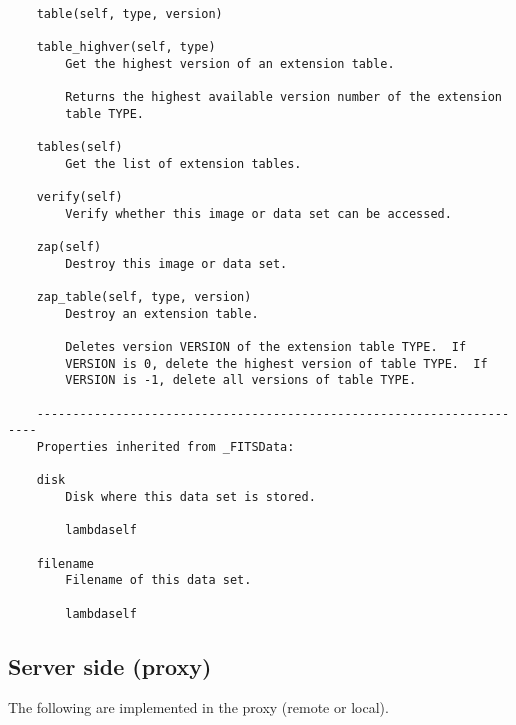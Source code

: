 \documentclass[11pt]{report}
\begin{document}
\begin{verbatim}
    table(self, type, version)
    
    table_highver(self, type)
        Get the highest version of an extension table.
        
        Returns the highest available version number of the extension
        table TYPE.
    
    tables(self)
        Get the list of extension tables.
    
    verify(self)
        Verify whether this image or data set can be accessed.
    
    zap(self)
        Destroy this image or data set.
    
    zap_table(self, type, version)
        Destroy an extension table.
        
        Deletes version VERSION of the extension table TYPE.  If
        VERSION is 0, delete the highest version of table TYPE.  If
        VERSION is -1, delete all versions of table TYPE.
    
    ----------------------------------------------------------------------
    Properties inherited from _FITSData:
    
    disk
        Disk where this data set is stored.
    
        lambdaself
    
    filename
        Filename of this data set.
    
        lambdaself
\end{verbatim}

\subsection{Server side (proxy)}
The following are implemented in the proxy (remote or local).
\end{document}
